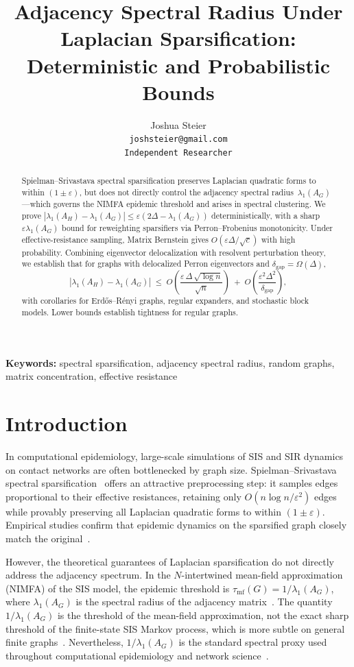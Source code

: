 \documentclass[11pt]{article}
\title{Adjacency Spectral Radius Under Laplacian Sparsification:\\
Deterministic and Probabilistic Bounds}
\author{Joshua Steier\\[4pt]
\small \texttt{joshsteier@gmail.com}\\[2pt]
\small \texttt{Independent Researcher}}
\date{}
\theoremstyle{definition}
\newcommand{\eps}{\varepsilon}
\newcommand{\lamH}{\lambda_1(A_H)}
\newcommand{\lamG}{\lambda_1(A_G)}
\begin{document}
\maketitle

\begin{abstract}
Spielman--Srivastava spectral sparsification preserves Laplacian quadratic forms to
within $(1 \pm \eps)$, but does not directly control the adjacency spectral
radius~$\lamG$---which governs the NIMFA epidemic threshold and arises in spectral
clustering. We prove $|\lamH - \lamG| \leq \eps(2\Delta - \lamG)$ deterministically,
with a sharp $\eps\lamG$ bound for reweighting sparsifiers via Perron--Frobenius
monotonicity. Under effective-resistance sampling, Matrix Bernstein gives
$O(\eps\Delta/\sqrt{c})$ with high probability. Combining eigenvector delocalization
with resolvent perturbation theory, we establish that for graphs with delocalized
Perron eigenvectors and $\delta_{\mathrm{gap}} = \Omega(\Delta)$,
\[
|\lamH - \lamG| \;\leq\;
O\!\left(\frac{\eps\,\Delta\,\sqrt{\log n}}{\sqrt{n}}\right)
\;+\; O\!\left(\frac{\eps^2\Delta^2}{\delta_{\mathrm{gap}}}\right),
\]
with corollaries for Erd\H{o}s--R\'{e}nyi graphs, regular expanders, and stochastic
block models. Lower bounds establish tightness for regular graphs.
\end{abstract}

\medskip
\noindent\textbf{Keywords:} spectral sparsification, adjacency spectral radius, random graphs, matrix concentration, effective resistance

\section{Introduction}\label{sec:intro}

In computational epidemiology, large-scale simulations of SIS and SIR dynamics on contact
networks are often bottlenecked by graph size. Spielman--Srivastava spectral
sparsification~\citep{spielman2011graph} offers an attractive preprocessing step: it
samples edges proportional to their effective resistances, retaining only
$O(n \log n / \eps^2)$ edges while provably preserving all Laplacian quadratic forms
to within $(1 \pm \eps)$. Empirical studies confirm that epidemic dynamics on the
sparsified graph closely match the original~\citep{mercier2022effective}.

However, the theoretical guarantees of Laplacian sparsification do not directly address
the adjacency spectrum. In the $N$-intertwined mean-field approximation (NIMFA) of the
SIS model, the epidemic threshold is $\tau_{\mathrm{mf}}(G) = 1/\lamG$, where $\lamG$
is the spectral radius of the adjacency
matrix~\citep{vanmieghem2009virus,wang2003epidemic}. The quantity $1/\lamG$ is the
threshold of the mean-field approximation, not the exact sharp threshold of the
finite-state SIS Markov process, which is more subtle on general finite
graphs~\citep{vanmieghem2014exact}. Nevertheless, $1/\lamG$ is the standard spectral proxy
used throughout computational epidemiology and network science~\citep{vanmieghem2011nimfa}.
\end{document}
